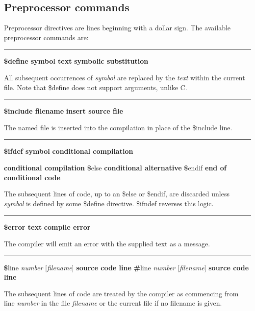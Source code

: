 \subsection*{Preprocessor commands}

Preprocessor directives are lines beginning with a dollar sign. The
available preprocessor commands are:

\bigskip\hrule\vspace{0.1cm}
\noindent
{\bf \$define symbol text } \hfill {\bf symbolic substitution}

\noindent
{}All subsequent occurrences of \textit{symbol} are
replaced by the \textit{text} within the current file. Note that
\$define does not support arguments, unlike C.

\bigskip\hrule\vspace{0.1cm}
\noindent
{\bf \$include filename } \hfill {\bf insert source file}

\noindent
{}The named file is inserted into the compilation in place
of the \$include line.

\bigskip\hrule\vspace{0.1cm}
\noindent
{\bf \$ifdef symbol } \hfill {\bf conditional compilation}

\noindent
{} \hfill {\bf conditional compilation}
\linebreak
{\textbf \$else } \hfill {\bf conditional alternative}
\linebreak
{\textbf \$endif } \hfill {\bf end of conditional code}

The subsequent lines of code, up to an \$else or \$endif, are discarded
unless \textit{symbol} is defined by some \$define directive. \$ifndef
reverses this logic.

\bigskip\hrule\vspace{0.1cm}
\noindent
{\bf \$error text } \hfill {\bf compile error}

\noindent
{}The compiler will emit an error with the
supplied text as a message.


\bigskip\hrule\vspace{0.1cm}
\noindent
{\textbf \$line \textit{number} [\textit{filename}] } \hfill {\bf source code line}
{\textbf \#line \textit{number} [\textit{filename}] } \hfill {\bf source code line}

\noindent
The subsequent lines of code are treated by the compiler as commencing
from line \textit{number} in the file \textit{filename} or the current
file if no filename is given.

